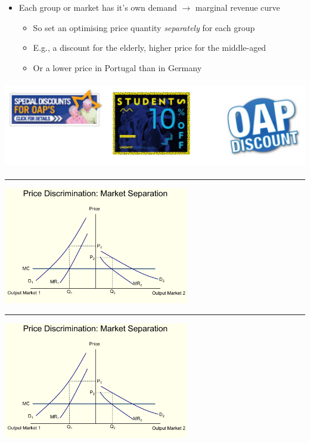 \documentclass[]{article}
\providecommand{\tightlist}{%
  \setlength{\itemsep}{0pt}\setlength{\parskip}{0pt}}
\begin{document}
\begin{itemize}
\tightlist
\item
  Each group or market has it's own demand \(\rightarrow\) marginal
  revenue curve

  \begin{itemize}
  \tightlist
  \item
    So set an optimising price quantity \emph{separately} for each group
  \item
    E.g., a discount for the elderly, higher price for the middle-aged
  \item
    Or a lower price in Portugal than in Germany
  \end{itemize}
\end{itemize}

\includegraphics[height=1.5in]{picsfigs/discounts.png}

\begin{center}\rule{0.5\linewidth}{\linethickness}\end{center}

\includegraphics[height=2in]{picsfigs/3dpd.png}

\begin{center}\rule{0.5\linewidth}{\linethickness}\end{center}

\includegraphics[height=2in]{picsfigs/3dpd.png}
\end{document}
